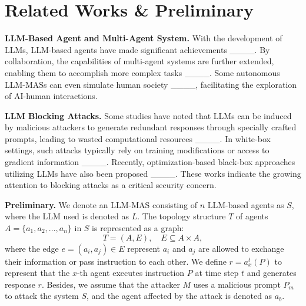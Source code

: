 \section{Related Works \& Preliminary}
\label{sec:re}

\noindent\textbf{LLM-Based Agent and Multi-Agent System.} \label{sec: rw1}
With the development of LLMs, LLM-based agents have made significant achievements ____. 
By collaboration, the capabilities of multi-agent systems are further extended, enabling them to accomplish more complex tasks ____. 
Some autonomous LLM-MASs can even simulate human society ____, facilitating the exploration of AI-human interactions. 

\noindent\textbf{LLM Blocking Attacks.} \label{sec: rw2}
Some studies have noted that LLMs can be induced by malicious attackers to generate redundant responses through specially crafted prompts, leading to wasted computational resources ____. 
In white-box settings, such attacks typically rely on training modifications or access to gradient information ____. 
Recently, optimization-based black-box approaches utilizing LLMs have also been proposed ____. 
These works indicate the growing attention to blocking attacks as a critical security concern.

\noindent \textbf{Preliminary.} We denote an LLM-MAS consisting of \( n \) LLM-based agents as $S$, where the LLM used is denoted as \( L \). 
The topology structure $T$ of agents $A = \{a_1, a_2, ..., a_n\}$ in $S$ is represented as a graph:
\[
T = (A, E), \quad E \subseteq A \times A,
\]
where the edge $e=(a_i, a_j) \in E$ represent $a_i$ and $a_j$ are allowed to exchange their information or pass instruction to each other. We define \( r = a_x^t(P) \) to represent that the \( x \)-th agent executes instruction \( P \) at time step \( t \) and generates response \( r \).
Besides, we assume that the attacker $M$ uses a malicious prompt $P_m$ to attack the system $S$, and the agent affected by the attack is denoted as $a_b$.